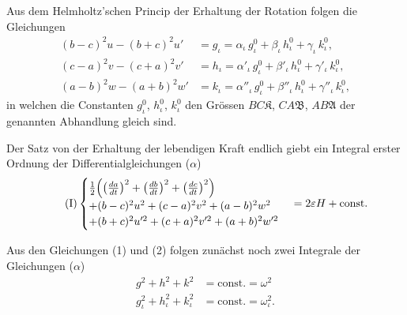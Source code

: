 \documentclass[12pt,a4paper]{article}
\begin{document}
Aus dem Helmholtz'schen Princip der Erhaltung der Rotation folgen die Gleichungen
\begin{equation}
\tag{2}
\begin{aligned}
(b-c)^2u - (b+c)^2u' &= g_\iota = \alpha_\iota\,g^0_\iota + \beta_\iota\,h^0_\iota + \gamma_\iota\,k^0_\iota,\\
(c-a)^2v - (c+a)^2v' &= h_\iota = \alpha'_\iota\,g^0_\iota + \beta'_\iota\,h^0_\iota + \gamma'_\iota\,k^0_\iota,\\
(a-b)^2w - (a+b)^2w' &= k_\iota = \alpha''_{\iota}\,g^0_\iota + \beta''_{\iota}\,h^0_\iota + \gamma''_{\iota}\,k^0_\iota,
\end{aligned}
\end{equation}
in welchen die Constanten $g^0_\iota$, $h^0_\iota$, $k^0_\iota$ den Grössen $BC\mathfrak{K}$, $CA\mathfrak{B}$, $AB\mathfrak{A}$ der genannten Abhandlung gleich sind.

Der Satz von der Erhaltung der lebendigen Kraft endlich giebt ein Integral erster Ordnung der Differentialgleichungen ($\alpha$)
\begin{equation}
\tag{I}
\begin{cases}
\tfrac{1}{2}\Bigl(\bigl(\frac{da}{dt}\bigr)^2 + \bigl(\frac{db}{dt}\bigr)^2 + \bigl(\frac{dc}{dt}\bigr)^2\Bigr)\\
+ (b-c)^2u^2 + (c-a)^2v^2 + (a-b)^2w^2\\
+ (b+c)^2u'^2 + (c+a)^2v'^2 + (a+b)^2w'^2
\end{cases}
= 2\varepsilon H + \text{const.}
\end{equation}

Aus den Gleichungen (1) und (2) folgen zunächst noch zwei Integrale der Gleichungen ($\alpha$)
\begin{align*}
\tag{II} g^2 + h^2 + k^2 &= \text{const.} = \omega^2\\
\tag{III} g_\iota^2 + h_\iota^2 + k_\iota^2 &= \text{const.} = \omega_\iota^2.
\end{align*}
\end{document}
